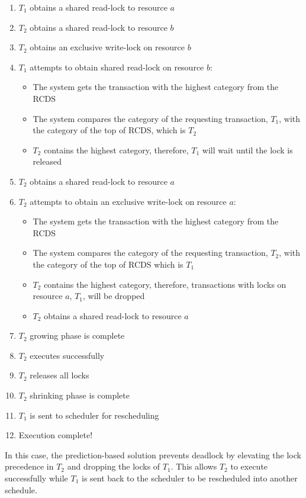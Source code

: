 \begin{enumerate}
  \item $T_{1}$ obtains a shared read-lock to resource $a$
  \item $T_{2}$ obtains a shared read-lock to resource $b$
  \item $T_{2}$ obtains an exclusive write-lock on resource $b$
  \item $T_{1}$ attempts to obtain shared read-lock on resource $b$:
    \begin{itemize}
        \item The system gets the transaction with the highest category from the \ac{RCDS}
        \item The system compares the category of the requesting transaction, $T_{1}$, with the category of the top of \ac{RCDS}, which is $T_{2}$
        \item $T_{2}$ contains the highest category, therefore, $T_{1}$ will wait until the lock is released
    \end{itemize}
  \item $T_{2}$ obtains a shared read-lock to resource $a$
  \item $T_{2}$ attempts to obtain an exclusive write-lock on resource $a$:
    \begin{itemize}
        \item The system gets the transaction with the highest category from the \ac{RCDS}
        \item The system compares the category of the requesting transaction, $T_{2}$, with the category of the top of \ac{RCDS} which is $T_{1}$
        \item $T_{2}$ contains the highest category, therefore, transactions with locks on resource $a$, $T_{1}$, will be dropped
        \item $T_{2}$ obtains a shared read-lock to resource $a$
    \end{itemize}    
  \item $T_{2}$ growing phase is complete
  \item $T_{2}$ executes successfully
  \item $T_{2}$ releases all locks
  \item $T_{2}$ shrinking phase is complete
  \item $T_{1}$ is sent to scheduler for rescheduling
  \item Execution complete!
\end{enumerate}

In this case, the prediction-based solution prevents deadlock by elevating the lock precedence in $T_{2}$ and dropping the locks of $T_{1}$. This allows $T_{2}$ to execute successfully while $T_{1}$ is sent back to the scheduler to be rescheduled into another schedule.

